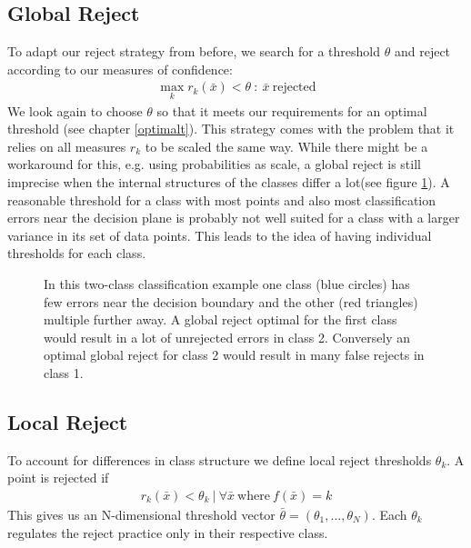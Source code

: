 \subsection{Global Reject}
To adapt our reject strategy from before, we search for a threshold $\theta$ and reject according to our measures of confidence:
\begin{align}
\operatorname*{max}_k r_k(\bar{x}) < \theta \ : \ \bar{x} \ \text{rejected}
\end{align}
We look again to choose $\theta$ so that it meets our requirements for an optimal threshold (see chapter \ref{optimalt}). This strategy comes with the problem that it relies on all measures $r_k$ to be scaled the same way. While there might be a workaround for this, e.g. using probabilities as scale, a global reject is still imprecise when the internal structures of the classes differ a lot(see figure \ref{classStructure}). A reasonable threshold for a class with most points and also most classification errors near the decision plane is probably not well suited for a class with a larger variance in its set of data points. This leads to the idea of having individual thresholds for each class.

\begin{figure}[!htbp]
\centering
\caption{In this two-class classification example one class (blue circles) has few errors near the decision boundary and the other (red triangles) multiple further away. A global reject optimal for the first class would result in a lot of unrejected errors in class 2. Conversely an optimal global reject for class 2 would result in many false rejects in class 1.}
\label{classStructure}
\end{figure}

\subsection{Local Reject}
\label{localreject}
To account for differences in class structure we define local reject thresholds $\theta_k$. A point is rejected if
\begin{align}
r_k(\bar{x}) < \theta_k \ | \ \forall \bar{x} \  \text{where} \ f(\bar{x}) = k
\end{align}
This gives us an N-dimensional threshold vector $\bar{\theta} = (\theta_1,...,\theta_N)$. Each $\theta_k$ regulates the reject practice only in their respective class.

